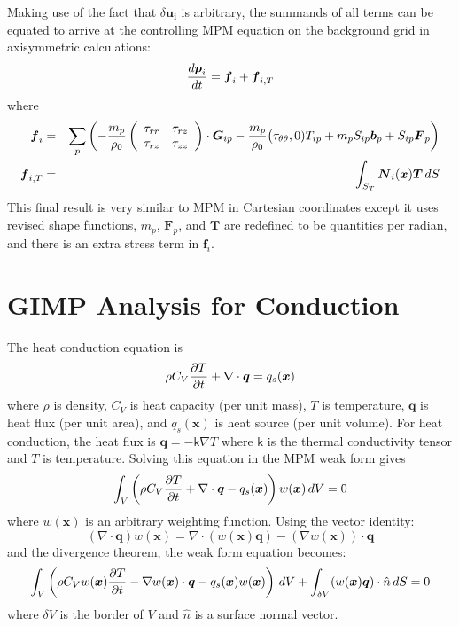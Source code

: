 \documentclass[11pt]{article}
\renewcommand{\vec}[1]{\boldsymbol{#1}}
\newcommand{\tens}[1]{\boldsymbol{\mathsf{#1}}}
\begin{document}
Making use of the fact that $\delta\vec{u_i}$ is arbitrary, the summands of all terms can be equated to arrive at the controlling MPM equation on the background grid in axisymmetric calculations:
\begin{equation}
    {d\vec p_i\over dt}= \vec f_i + \vec f_{i,T}
\end{equation}
where
\begin{eqnarray}
	 \vec f_i & = & \sum_p \left(-{m_p\over \rho_0}\left(\begin{array}{cc} \tau_{rr} & \tau_{rz} \\ \tau_{rz} & \tau_{zz} \end{array}\right)\cdot \vec G_{ip} 
	       - {m_p\over \rho_0} \bigl( \tau_{\theta\theta},0) T_{ip} + m_p S_{ip}  \vec b_p + S_{ip} \vec F_p\right) \\
	 \vec f_{i,T} & = & \int_{S_T}\vec N_i(\vec x) \vec T \thinspace dS
\end{eqnarray}
This final result is very similar to MPM in Cartesian coordinates except it uses revised shape functions, $m_p$, $\vec F_p$, and $\vec T$ are redefined to be quantities per radian, and there is an extra stress term in $\vec f_i$.


\section{GIMP Analysis for Conduction}

The heat conduction equation is
\begin{equation}
   \rho C_V {\partial T\over \partial t} + \nabla \cdot \vec q = q_s(\vec x)
\end{equation}
where $\rho$ is density, $C_V$ is heat capacity (per unit mass), $T$ is temperature, $\vec q$ is heat flux (per unit area), and $q_s(\vec x)$ is heat source (per unit volume). For heat conduction, the heat flux is $\vec q = -\tens k\nabla T$ where $\tens k$ is the thermal conductivity tensor and $T$ is temperature. Solving this equation in the MPM weak form gives
\begin{equation}
   \int_V \left(\rho C_V {\partial T\over \partial t} + \nabla \cdot \vec q - q_s(\vec x)\right)w(\vec x)\thinspace dV = 0
\end{equation}
where $w(\vec x)$ is an arbitrary weighting function. Using the vector identity:
\begin{equation}
     \left(\nabla\cdot\vec q\right)w(\vec x) = \nabla \cdot \left(w(\vec x)\vec q\right) - \left(\nabla w(\vec x)\right)\cdot \vec q 
\end{equation}
and the divergence theorem, the weak form equation becomes:
\begin{equation}
    \int_V \left(\rho C_V w(\vec x) {\partial T\over \partial t} -\nabla w(\vec x) \cdot \vec q - q_s(\vec x)w(\vec x)\right)\thinspace dV  + \int_{\delta V} (w(\vec x)\vec q) \cdot \hat n \thinspace dS = 0
\end{equation}
where $\delta V$ is the border of $V$ and $\hat n$ is a surface normal vector.
\end{document}

